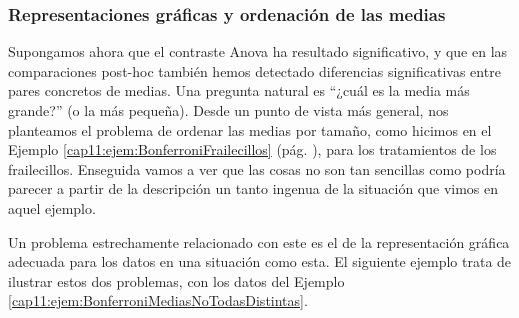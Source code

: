 \subsubsection{Representaciones gráficas y ordenación de las medias}
\label{cap11:subsubsec:RepresentacionesGraficasOrdenacionMedias}


Supongamos ahora que el contraste Anova ha resultado significativo, y que en las comparaciones post-hoc también hemos detectado diferencias significativas entre pares concretos de medias. Una pregunta natural es ``¿cuál es la media más grande?'' (o la más pequeña). Desde un punto de vista más general, nos planteamos el problema de ordenar las medias por tamaño, como hicimos en el Ejemplo \ref{cap11:ejem:BonferroniFrailecillos} (pág. \pageref{cap11:ejem:BonferroniFrailecillos}), para los tratamientos de los frailecillos. Enseguida vamos a ver que las cosas no son tan sencillas como podría parecer a partir de la descripción un tanto ingenua de la situación que vimos en aquel ejemplo.

Un problema estrechamente relacionado con este es el de la representación gráfica adecuada para los datos en una situación como esta. El siguiente ejemplo trata de ilustrar estos dos problemas, con los datos del Ejemplo \ref{cap11:ejem:BonferroniMediasNoTodasDistintas}.

